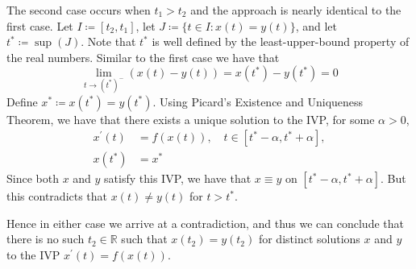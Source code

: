 \documentclass{article}
\newcommand{\R}{\mathbb{R}}
\begin{document}
The second case occurs when $t_1 > t_2$ and the approach is nearly identical to the first case.
Let $I \coloneqq [t_2, t_1]$, let $J \coloneqq \{t \in I: x(t) = y(t)\}$, and let $t^* \coloneqq \sup(J)$.
Note that $t^*$ is well defined by the least-upper-bound property of the real numbers.
Similar to the first case we have that
%
\begin{equation*}
    \lim_{t \to (t^*)^-} (x(t) - y(t)) = x(t^*) - y(t^*) = 0
\end{equation*}
%
Define $x^* \coloneqq x(t^*) = y(t^*)$. Using Picard's Existence and Uniqueness Theorem, we have
that there exists a unique solution to the IVP, for some $\alpha > 0$,
%
\begin{align*}
    x^\prime(t) &= f(x(t)), \quad t \in [t^* - \alpha, t^* + \alpha], \\
    x(t^*) &= x^*
\end{align*}
%
Since both $x$ and $y$ satisfy this IVP, we have that $x \equiv y$ on $[t^* - \alpha, t^* + \alpha]$.
But this contradicts that $x(t) \neq y(t)$ for $t > t^*$.

Hence in either case we arrive at a contradiction, and thus we can conclude that there
is no such $t_2 \in \R$ such that $x(t_2) = y(t_2)$ for distinct solutions
$x$ and $y$ to the IVP $x^\prime(t) = f(x(t))$.
\end{document}
